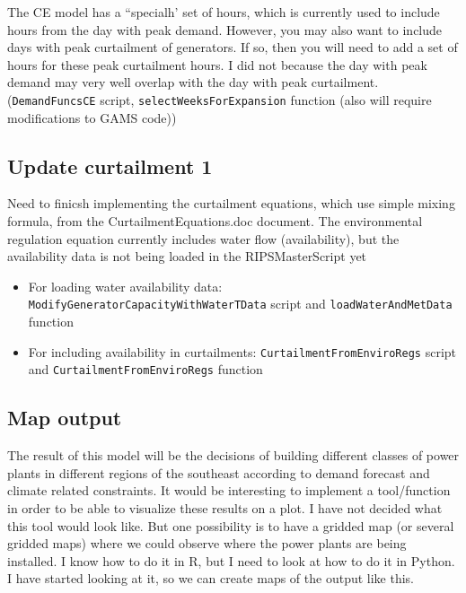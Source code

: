 \documentclass[11pt, oneside]{article}   	%
\begin{document}
The CE model has a ``specialh' set of hours, which is currently used to include hours from the day with peak demand. However, you may also want to include days with peak curtailment of generators. If so, then you will need to add a set of hours for these peak curtailment hours. I did not because the day with peak demand may very well overlap with the day with peak curtailment. (\texttt{DemandFuncsCE} script, \texttt{selectWeeksForExpansion} function (also will require modifications to GAMS code))

\subsection{Update curtailment 1}

Need to finicsh implementing the curtailment equations, which use simple mixing formula, from the CurtailmentEquations.doc document. The environmental regulation equation currently includes water flow (availability), but the availability data is not being loaded in the RIPSMasterScript yet

\begin{itemize}
\item For loading water availability data: \texttt{ModifyGeneratorCapacityWithWaterTData} script and \texttt{loadWaterAndMetData} function
\item For including availability in curtailments: \texttt{CurtailmentFromEnviroRegs} script and \texttt{CurtailmentFromEnviroRegs} function
\end{itemize}

\subsection{Map output}

The result of this model will be the decisions of building different classes of power plants in different regions of the southeast according to demand forecast and climate related constraints. It would be interesting to implement a tool/function in order to be able to visualize these results on a plot. I have not decided what this tool would look like. But one possibility is to have a gridded map (or several gridded maps) where we could observe where the power plants are being installed. I know how to do it in R, but I need to look at how to do it in Python. I have started looking at it, so we can create maps of the output like this.
\end{document}
